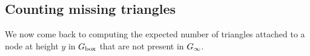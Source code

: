 
\subsection{Counting missing triangles}\label{ssec:missing_triangles}

We now come back to computing the expected number of triangles attached to a node at height $y$ in $G_{\mathrm{box}}$ that are not present in $G_{\infty}$. 


